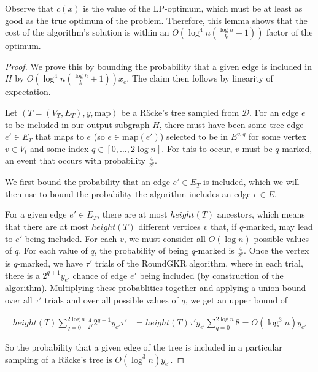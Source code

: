 \documentclass[12pt]{article}
\begin{document}
Observe that $c(x)$ is the value of the LP-optimum, which must be at least as good as the true optimum of the problem. Therefore, this lemma shows that the cost of the algorithm's solution is within an $O(\log^4n(\frac{\log h}{k}+1))$ factor of the optimum.

\begin{proof}
We prove this by bounding the probability that a given edge is included in $H$ by $O(\log^4n(\frac{\log h}{k} + 1))x_e$. The claim then follows by linearity of expectation.

Let $(T = (V_T, E_T), y, \text{map})$ be a R\"{a}cke's tree sampled from $\mathcal{D}$. For an edge $e$ to be included in our output subgraph $H$, there must have been some tree edge $e' \in E_T$ that maps to $e$ (so $e \in \mathrm{map}(e')$) selected to be in $E^{v,q}$ for some vertex $v \in V_t$ and some index $q \in [0,\dots,2\log n]$. For this to occur, $v$ must be $q$-marked, an event that occurs with probability $\frac{4}{2^{q}}$. 

We first bound the probability that an edge $e' \in E_T$ is included, which we will then use to bound the probability the algorithm includes an edge $e \in E$.

For a given edge $e' \in E_T$, there are at most $height(T)$ ancestors, which means that there are at most $height(T)$ different vertices $v$ that, if $q$-marked, may lead to $e'$ being included. For each $v$, we must consider all $O(\log n)$ possible values of $q$. For each value of $q$, the probability of being $q$-marked is $\frac{4}{2^{q}}$. Once the vertex is $q$-marked, we have $\tau'$ trials of the RoundGKR algorithm, where in each trial, there is a $2^{q+1}y_{e'}$ chance of edge $e'$ being included (by construction of the algorithm). Multiplying these probablities together and applying a union bound over all $\tau'$ trials and over all possible values of $q$, we get an upper bound of 

\begin{align}
height(T) \sum_{q=0}^{2\log n} \frac{4}{2^{q}} 2^{q+1} y_{e'} \tau' &= height(T) \tau' y_{e'} \sum_{q=0}^{2\log n} 8 = O(\log^3 n) y_{e'} 
\end{align}

So the probability that a given edge of the tree is included in a particular sampling of a R\"{a}cke's tree is $O(\log^3 n) y_{e'}$. 


\end{proof}
\end{document}
